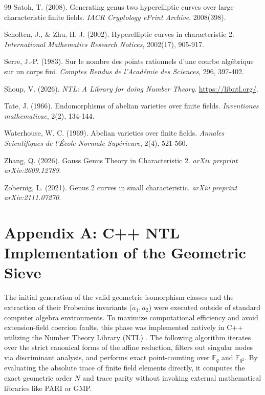 \documentclass[letterpaper, 11pt]{article}
\begin{document}
\begin{thebibliography}{99}
		Satoh, T. (2008). Generating genus two hyperelliptic curves over large characteristic finite fields. \textit{IACR Cryptology ePrint Archive}, 2008(398).
		
		Scholten, J., \& Zhu, H. J. (2002). Hyperelliptic curves in characteristic 2. \textit{International Mathematics Research Notices}, 2002(17), 905-917.
		
		Serre, J.-P. (1983). Sur le nombre des points rationnels d'une courbe algébrique sur un corps fini. \textit{Comptes Rendus de l'Académie des Sciences}, 296, 397-402.
		
		Shoup, V. (2026). \textit{NTL: A Library for doing Number Theory}. \url{https://libntl.org/}.
		
		Tate, J. (1966). Endomorphisms of abelian varieties over finite fields. \textit{Inventiones mathematicae}, 2(2), 134-144.
		
		Waterhouse, W. C. (1969). Abelian varieties over finite fields. \textit{Annales Scientifiques de l'\'{E}cole Normale Sup\'{e}rieure}, 2(4), 521-560.
		
		Zhang, Q. (2026). Gauss Genus Theory in Characteristic 2. \textit{arXiv preprint arXiv:2609.12789}.
		
		Zobernig, L. (2021). Genus 2 curves in small characteristic. \textit{arXiv preprint arXiv:2111.07270}.
		
	\end{thebibliography}
	
	\appendix
	\section{Appendix A: C++ NTL Implementation of the Geometric Sieve}
	The initial generation of the valid geometric isomorphism classes and the extraction of their Frobenius invariants ($a_1, a_2$) were executed outside of standard computer algebra environments. To maximize computational efficiency and avoid extension-field coercion faults, this phase was implemented natively in C++ utilizing the Number Theory Library (NTL) \cite{ShoupNTL}. The following algorithm iterates over the strict canonical forms of the affine reduction, filters out singular nodes via discriminant analysis, and performs exact point-counting over $\mathbb{F}_q$ and $\mathbb{F}_{q^2}$. By evaluating the absolute trace of finite field elements directly, it computes the exact geometric order $N$ and trace parity without invoking external mathematical libraries like PARI or GMP.
	
\end{document}
